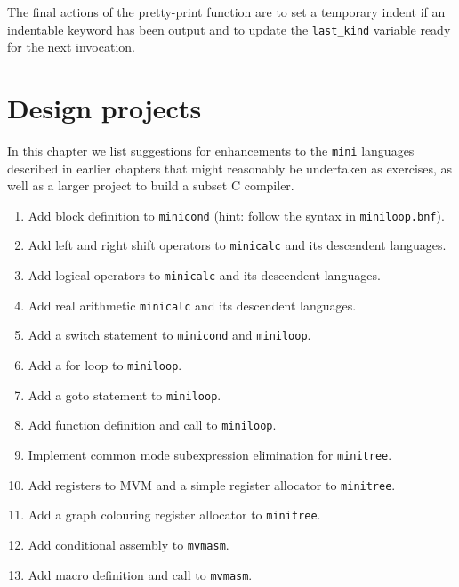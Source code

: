 The final actions of the pretty-print function are to set a temporary indent if an 
indentable keyword has been output and to update the \verb+last_kind+ variable ready for the next
invocation.

\chapter{Design projects}

In this chapter we list suggestions for enhancements to the {\tt mini}
languages described in earlier chapters that might reasonably be
undertaken as exercises, as well as a larger project to build a subset C
compiler. 

\begin{enumerate}
\item Add block definition to {\tt minicond} (hint: follow the syntax in {\tt miniloop.bnf}).

\item Add left and right shift operators to {\tt minicalc} and its descendent languages.

\item Add logical operators to {\tt minicalc} and its descendent languages.

\item Add real arithmetic {\tt minicalc} and its descendent languages.

\item Add a switch statement to {\tt minicond} and {\tt miniloop}.

\item Add a for loop to {\tt miniloop}.

\item Add a goto statement to {\tt miniloop}.

\item Add function definition and call to {\tt miniloop}.

\item Implement common mode subexpression elimination for {\tt minitree}.

\item Add registers to MVM and a simple register allocator to {\tt minitree}.

\item Add a graph colouring register allocator to {\tt minitree}.

\item Add conditional assembly to {\tt mvmasm}.

\item Add macro definition and call to {\tt mvmasm}.


\end{enumerate}
